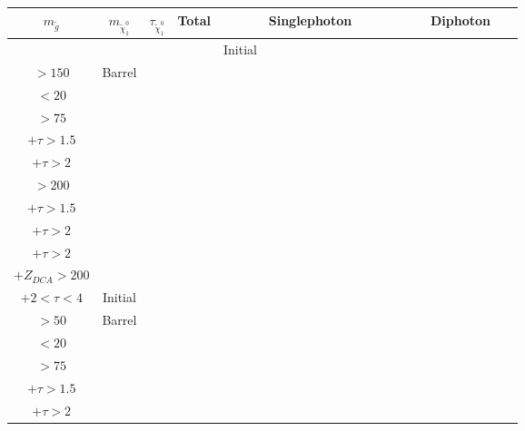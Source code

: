 \documentclass[8pt]{extarticle}
\begin{document}
\begin{longtable}{|c|c|c|c|c|c|c|c|c|c|c|c|c|c|c|c|c|c|c|c|c|c|c|c|c|}
\hline 
$m_{\tilde{g}}$ & $m_{\tilde{\chi}_1^0}$ & $\tau_{\tilde{\chi}_1^0}$ & Total &\multicolumn{12}{|c|}{Singlephoton} & \multicolumn{9}{|c|}{Diphoton} \\ 
\hline 
 & & & & Initial & \begin{tabular}{@{}c@{}} $p_T$ \\ $> 150$\end{tabular} & Barrel & \begin{tabular}{@{}c@{}} $E_T^{miss}$ \\ $< 20$\end{tabular} & \begin{tabular}{@{}c@{}} $E_T^{miss}$ \\ $> 75$\end{tabular} & \begin{tabular}{@{}c@{}} $E_T^{miss} > 75$ \\ $+ \tau > 1.5$ \end{tabular} & \begin{tabular}{@{}c@{}} $E_T^{miss} > 75$ \\ $+ \tau > 2$ \end{tabular} & \begin{tabular}{@{}c@{}} $E_T^{miss}$ \\ $> 200$\end{tabular} & \begin{tabular}{@{}c@{}} $E_T^{miss} > 200$ \\ $+ \tau > 1.5$ \end{tabular} & \begin{tabular}{@{}c@{}} $E_T^{miss} > 200$ \\ $+ \tau > 2$ \end{tabular} & \begin{tabular}{@{}c@{}} $E_T^{miss} > 200$ \\ $+ \tau > 2$ \\ $+Z_{DCA} > 200$\end{tabular} & \begin{tabular}{@{}c@{}} $E_{T}^{miss} > 200$ \\ $+ 2 < \tau < 4$ \end{tabular} & Initial & \begin{tabular}{@{}c@{}} $p_T$ \\ $> 50$\end{tabular} & Barrel & \begin{tabular}{@{}c@{}} $E_T^{miss}$ \\ $< 20$\end{tabular} & \begin{tabular}{@{}c@{}} $E_T^{miss}$ \\ $> 75$\end{tabular} & \begin{tabular}{@{}c@{}} $E_T^{miss} > 75$ \\ $+ \tau > 1.5$\end{tabular} & \begin{tabular}{@{}c@{}} $E_T^{miss} > 75$ \\ $+ \tau > 2$ \end{tabular} & 
\end{longtable}
\end{document}
